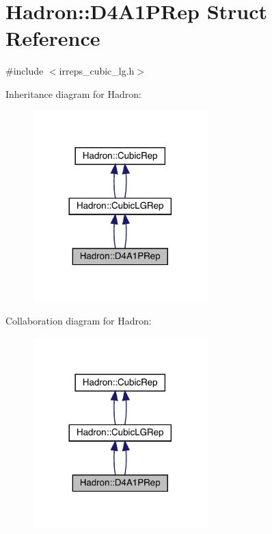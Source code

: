 \hypertarget{structHadron_1_1D4A1PRep}{}\section{Hadron\+:\+:D4\+A1\+P\+Rep Struct Reference}
\label{structHadron_1_1D4A1PRep}


{\ttfamily \#include $<$irreps\+\_\+cubic\+\_\+lg.\+h$>$}



Inheritance diagram for Hadron\+:\nopagebreak
\begin{figure}[H]
\begin{center}
\leavevmode
\includegraphics[width=192pt]{d3/dd0/structHadron_1_1D4A1PRep__inherit__graph}
\end{center}
\end{figure}


Collaboration diagram for Hadron\+:\nopagebreak
\begin{figure}[H]
\begin{center}
\leavevmode
\includegraphics[width=192pt]{d1/da2/structHadron_1_1D4A1PRep__coll__graph}
\end{center}
\end{figure}
